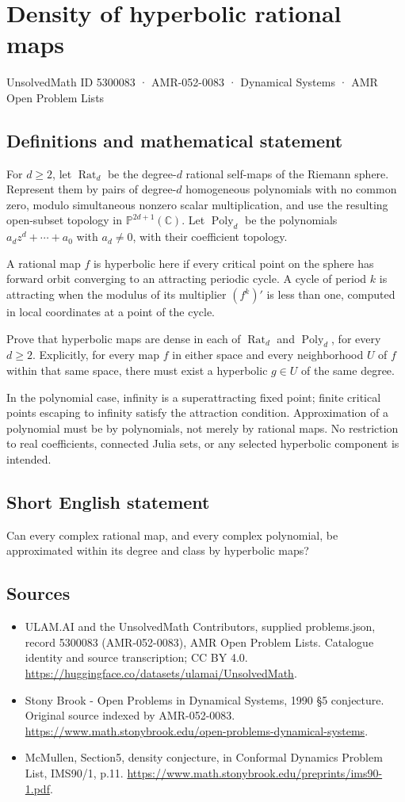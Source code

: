 \documentclass[11pt,a4paper]{article}
\begin{document}
\section*{Density of hyperbolic rational maps}\label{5300083}
{\small UnsolvedMath ID 5300083 · AMR-052-0083 · Dynamical Systems · AMR Open Problem Lists}
\subsection{Definitions and mathematical statement}
For $d\ge2$, let $\operatorname{Rat}_d$
be the degree-$d$ rational self-maps of
the Riemann sphere. Represent them by
pairs of degree-$d$ homogeneous polynomials
with no common zero, modulo simultaneous
nonzero scalar multiplication, and use
the resulting open-subset topology in
$\mathbb P^{2d+1}(\mathbb C)$. Let
$\operatorname{Poly}_d$ be the polynomials
$a_dz^d+\cdots+a_0$ with $a_d\ne0$,
with their coefficient topology.

A rational map $f$ is hyperbolic here
if every critical point on the sphere
has forward orbit converging to an
attracting periodic cycle. A cycle of
period $k$ is attracting when the
modulus of its multiplier $(f^k)'$
is less than one, computed in local
coordinates at a point of the cycle.

Prove that hyperbolic maps are dense
in each of $\operatorname{Rat}_d$ and
$\operatorname{Poly}_d$, for every $d\ge2$.
Explicitly, for every map $f$ in
either space and every neighborhood
$U$ of $f$ within that same space,
there must exist a hyperbolic $g\in U$
of the same degree.

In the polynomial case, infinity
is a superattracting fixed point;
finite critical points escaping to
infinity satisfy the attraction
condition. Approximation of a polynomial
must be by polynomials, not merely
by rational maps. No restriction
to real coefficients, connected
Julia sets, or any selected
hyperbolic component is intended.
\subsection{Short English statement}
Can every complex rational map, and every complex polynomial, be approximated within its degree and class by hyperbolic maps?
\subsection{Sources}
\begin{itemize}
\item[S1] ULAM.AI and the UnsolvedMath Contributors, supplied problems.json, record 5300083 (AMR-052-0083), AMR Open Problem Lists. Catalogue identity and source transcription; CC BY 4.0.
\url{https://huggingface.co/datasets/ulamai/UnsolvedMath}.
\item[S2] Stony Brook - Open Problems in Dynamical Systems, 1990 §5 conjecture. Original source indexed by AMR-052-0083.
\url{https://www.math.stonybrook.edu/open-problems-dynamical-systems}.
\item[S3] McMullen, Section5, density conjecture, in Conformal Dynamics Problem List, IMS90/1, p.11.
\url{https://www.math.stonybrook.edu/preprints/ims90-1.pdf}.
\end{itemize}
\end{document}
